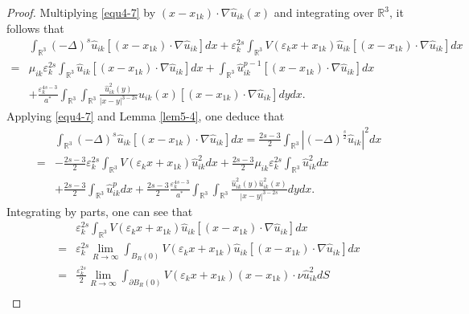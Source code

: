 \documentclass[10pt,a4paper]{amsart}
\begin{document}
	\begin{proof}
		Multiplying \eqref{equ4-7} by $(x-x_{1k})\cdot\nabla\hat{u}_{ik}(x)$ and integrating over $\mathbb{R}^{3}$, it follows that
		\begin{equation}\label{equ4-29}
			\begin{split}
				&\int_{\mathbb{R}^{3}}(-\Delta)^{s}\hat{u}_{ik}[(x-x_{1k})\cdot\nabla\hat{u}_{ik}]dx+\varepsilon_{k}^{2s}\int_{\mathbb{R}^{3}}V(\varepsilon_{k}x+x_{1k})\hat{u}_{ik}[(x-x_{1k})\cdot\nabla\hat{u}_{ik}]dx\\
				=&\mu_{ik}\varepsilon_{k}^{2s}\int_{\mathbb{R}^{3}}\hat{u}_{ik}[(x-x_{1k})\cdot\nabla\hat{u}_{ik}]dx+\int_{\mathbb{R}^{3}}\hat{u}_{ik}^{p-1}[(x-x_{1k})\cdot\nabla\hat{u}_{ik}]dx\\
				&+\frac{\varepsilon_{k}^{4s-3}}{a^{\ast}}\int_{\mathbb{R}^{3}}\int_{\mathbb{R}^{3}}\frac{\hat{u}_{ik}^{2}(y)}{|x-y|^{3-2s}}\hat{u}_{ik}(x)[(x-x_{1k})\cdot\nabla\hat{u}_{ik}]dydx.
			\end{split}
		\end{equation}
		Applying \eqref{equ4-7} and Lemma \ref{lem5-4}, one deduce that
		\begin{equation}\label{equ4-30}
			\begin{split}
				&\int_{\mathbb{R}^{3}}(-\Delta)^{s}\hat{u}_{ik}[(x-x_{1k})\cdot\nabla\hat{u}_{ik}]dx=\frac{2s-3}{2} \int_{\mathbb{R}^3} \left| (-\Delta)^{\frac{s}{2}}\hat{u}_{ik}\right| ^2dx\\
				=&-\frac{2s-3}{2}\varepsilon_{k}^{2s}\int_{\mathbb{R}^{3}} V(\varepsilon_{k}x+x_{1k})\hat{u}_{ik}^{2}dx+ \frac{2s-3}{2}\mu_{ik}\varepsilon_{k}^{2s}\int_{\mathbb{R}^{3}}\hat{u}_{ik}^{2}dx\\
				&+\frac{2s-3}{2}\int_{\mathbb{R}^{3}}\hat{u}_{ik}^{p}dx+\frac{2s-3}{2}\frac{\varepsilon_{k}^{4s-3}}{a^{\ast}}\int_{\mathbb{R}^{3}}\int_{\mathbb{R}^{3}}\frac{\hat{u}_{ik}^{2}(y)\hat{u}_{ik}^{2}(x)}{|x-y|^{3-2s}}dydx.
			\end{split}
		\end{equation}
		Integrating by parts, one can see that
		\begin{equation}\label{equ4-31}
			\begin{split}
				&\varepsilon_{k}^{2s}\int_{\mathbb{R}^{3}}V(\varepsilon_{k}x+x_{1k})\hat{u}_{ik}[(x-x_{1k})\cdot\nabla\hat{u}_{ik}]dx\\
				=&\varepsilon_{k}^{2s}\lim_{R\rightarrow\infty}\int_{ B_{R}(0)}V(\varepsilon_{k}x+x_{1k})\hat{u}_{ik}[(x-x_{1k})\cdot\nabla\hat{u}_{ik}]dx\\
				=&\frac{\varepsilon_{k}^{2s}}{2}\lim_{R\rightarrow\infty}\int_{\partial B_{R}(0)}V(\varepsilon_{k}x+x_{1k})(x-x_{1k})\cdot\nu\hat{u}_{ik}^{2}dS\\

\end{split}
\end{equation}
\end{proof}
\end{document}
